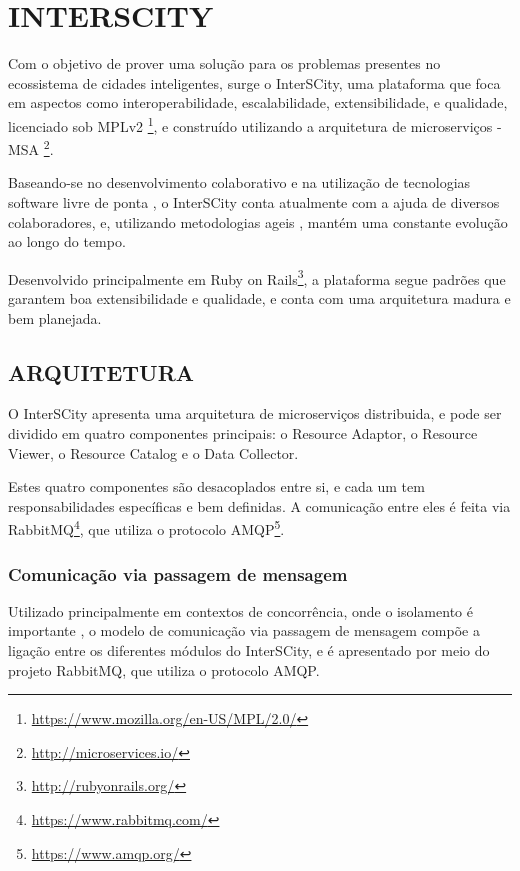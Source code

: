 \chapter[INTERSCITY]{INTERSCITY}

Com o objetivo de prover uma solução para os problemas presentes no ecossistema
de cidades inteligentes, surge o InterSCity, uma plataforma que foca em
aspectos como interoperabilidade, escalabilidade, extensibilidade, e qualidade,
licenciado sob
MPLv2 \footnote{\url{https://www.mozilla.org/en-US/MPL/2.0/}}, e construído
utilizando a arquitetura de microserviços -
MSA \footnote{\url{http://microservices.io/}}.

Baseando-se no desenvolvimento colaborativo e na utilização de tecnologias
software livre de ponta \cite{delesposte2017}, o InterSCity conta atualmente
com a ajuda de diversos colaboradores, e, utilizando metodologias ageis
\cite{delesposte2017}, mantém uma constante evolução ao longo do tempo.

Desenvolvido principalmente em
Ruby on Rails\footnote{\url{http://rubyonrails.org/}},
a plataforma segue padrões que garantem boa extensibilidade e qualidade, e
conta com uma arquitetura madura e bem planejada.

\section{ARQUITETURA}

O InterSCity apresenta uma arquitetura de microserviços distribuida, e pode
ser dividido em quatro componentes principais: o Resource Adaptor, o Resource
Viewer, o Resource Catalog e o Data Collector.

Estes quatro componentes são desacoplados entre si, e cada um tem
responsabilidades específicas e bem definidas. A comunicação entre eles é
feita via RabbitMQ\footnote{\url{https://www.rabbitmq.com/}}, que utiliza o
protocolo AMQP\footnote{\url{https://www.amqp.org/}}.

\subsection{Comunicação via passagem de mensagem}

Utilizado principalmente em contextos de concorrência, onde o isolamento é
importante \cite{armstrong2003}, o modelo de comunicação via passagem de
mensagem compõe a ligação entre os diferentes módulos do InterSCity, e é
apresentado por meio do projeto RabbitMQ, que utiliza o protocolo AMQP.


